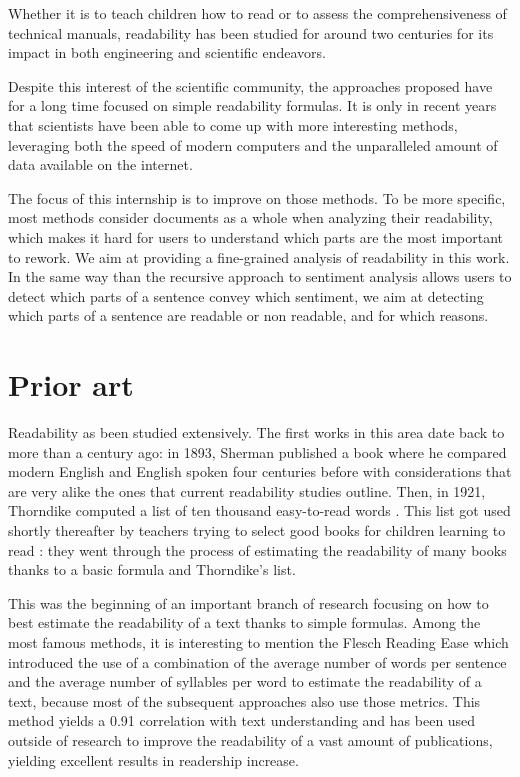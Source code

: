 \documentclass[a4paper, 11pt]{scrreprt}
\begin{document}
Whether it is to teach children how to read or to assess the
comprehensiveness of technical manuals, readability has been studied
for around two centuries for its impact in both engineering and
scientific endeavors.

Despite this interest of the scientific community, the approaches
proposed have for a long time focused on simple readability
formulas. It is only in recent years that scientists have been able to
come up with more interesting methods, leveraging both the speed of
modern computers and the unparalleled amount of data available on the
internet.

The focus of this internship is to improve on those methods. To be
more specific, most methods consider documents as a whole when
analyzing their readability, which makes it hard for users to
understand which parts are the most important to rework. We aim at
providing a fine-grained analysis of readability in this work. In the
same way than the recursive approach to sentiment analysis
\cite{socher2013recursive} allows users to detect which parts of a
sentence convey which sentiment, we aim at detecting which parts of a
sentence are readable or non readable, and for which reasons.

\chapter{Prior art}
\label{sec:sota}

Readability as been studied extensively. The first works in this area
date back to more than a century ago: in 1893, Sherman published a
book \cite{sherman1893analytics} where he compared modern English and
English spoken four centuries before with considerations that are very
alike the ones that current readability studies outline. Then, in
1921, Thorndike computed a list of ten thousand easy-to-read words
\cite{thorndike1921teacher}. This list got used shortly thereafter by
teachers trying to select good books for children learning to read
\cite{lively1923method}: they went through the process of estimating
the readability of many books thanks to a basic formula and
Thorndike's list.

This was the beginning of an important branch of research focusing on
how to best estimate the readability of a text thanks to simple
formulas. Among the most famous methods, it is interesting to mention
the Flesch Reading Ease \cite{flesch1948new} which introduced the use
of a combination of the average number of words per sentence and the
average number of syllables per word to estimate the readability of a
text, because most of the subsequent approaches also use those
metrics. This method yields a 0.91 correlation with text understanding
and has been used outside of research to improve the readability of a
vast amount of publications, yielding excellent results in readership
increase.
\end{document}
